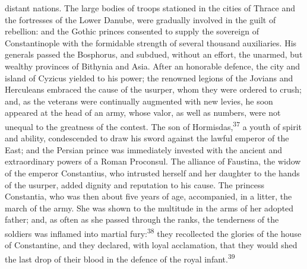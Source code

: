 distant nations. The large bodies of troops stationed in the
cities of Thrace and the fortresses of the Lower Danube, were
gradually involved in the guilt of rebellion: and the Gothic
princes consented to supply the sovereign of Constantinople with
the formidable strength of several thousand auxiliaries. His
generals passed the Bosphorus, and subdued, without an effort,
the unarmed, but wealthy provinces of Bithynia and Asia. After an
honorable defence, the city and island of Cyzicus yielded to his
power; the renowned legions of the Jovians and Herculeans
embraced the cause of the usurper, whom they were ordered to
crush; and, as the veterans were continually augmented with new
levies, he soon appeared at the head of an army, whose valor, as
well as numbers, were not unequal to the greatness of the
contest. The son of Hormisdas,\textsuperscript{37} a youth of spirit and ability,
condescended to draw his sword against the lawful emperor of the
East; and the Persian prince was immediately invested with the
ancient and extraordinary powers of a Roman Proconsul. The
alliance of Faustina, the widow of the emperor Constantius, who
intrusted herself and her daughter to the hands of the usurper,
added dignity and reputation to his cause. The princess
Constantia, who was then about five years of age, accompanied, in
a litter, the march of the army. She was shown to the multitude
in the arms of her adopted father; and, as often as she passed
through the ranks, the tenderness of the soldiers was inflamed
into martial fury:\textsuperscript{38} they recollected the glories of the house
of Constantine, and they declared, with loyal acclamation, that
they would shed the last drop of their blood in the defence of
the royal infant.\textsuperscript{39}




